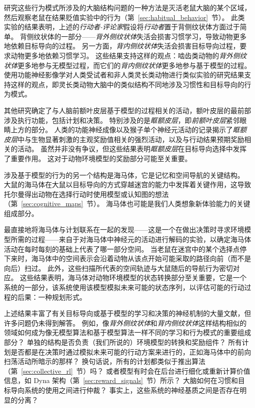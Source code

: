 研究这些行为模式所涉及的大脑结构问题的一种方法是灭活老鼠大脑的某个区域，然后观察老鼠在结果贬值实验中的行为（第~\ref{sec:habitual_behavior}~节）。
此类实验的结果表明，上述的\textit{行动者-评论家}假设将\textit{行动者}置于背侧纹状体方面过于简单。
背侧纹状体的一部分——\textit{背外侧纹状体}失活会损害习惯学习，导致动物更多地依赖目标导向的过程。
另一方面，\textit{背内侧纹状体}失活会损害目标导向过程，要求动物更多地依赖习惯学习。
这些结果支持这样的观点：啮齿类动物的\textit{背外侧纹状体}更多地参与无模型过程，而它们的\textit{背内侧纹状体}更多地参与基于模型的过程。
使用功能神经影像学对人类受试者和非人类灵长类动物进行类似实验的研究结果支持这样的观点，即灵长类动物大脑中的类似结构不同地涉及习惯性和目标导向的行为模式。


其他研究确定了与人脑前额叶皮层基于模型的过程相关的活动，额叶皮层的最前部涉及执行功能，包括计划和决策。
特别涉及的是\textit{眶额皮层}，即\textit{前额叶皮层}紧邻眼睛上方的部分。
人类的功能神经成像以及猴子单个神经元活动的记录揭示了\textit{眶额皮层}中与生物显著刺激的主观奖励值相关的强烈活动，以及与行动结果预期奖励相关的活动。
虽然并非没有争议，但这些结果表明\textit{眶额皮层}在目标导向选择中发挥了重要作用。
这对于动物环境模型的奖励部分可能至关重要。


涉及基于模型的行为的另一个结构是海马体，它是记忆和空间导航的关键结构。
大鼠的海马体在大鼠以目标导向的方式穿越迷宫的能力中发挥着关键作用，这导致托尔曼得出动物在选择行动时使用模型或认知图的想法（第~\ref{sec:cognitive_maps}~节）。
海马体也可能是我们人类想象新体验能力的关键组成部分\cite{hassabis2007deconstructing,olafsdottir2015hippocampal}。


最直接地将海马体与计划联系在一起的发现——这是一个在做出决策时寻求环境模型所需的过程——来自于对海马体中神经元的活动进行解码的实验，以确定海马体活动在每时每刻的基础上代表了哪一部分空间。
当老鼠在迷宫中的某个选择点停下来时，海马体中的空间表示会沿着动物从该点开始可能采取的路径向前（而不是向后）扫过\cite{johnson2007neural}。
此外，这些扫描所代表的空间轨迹与大鼠随后的导航行为密切对应\cite{pfeiffer2013hippocampal}。
这些结果表明，海马体对动物环境模型的状态转换部分至关重要，它是一个系统的一部分，该系统使用该模型模拟未来可能的状态序列，以评估可能的行动过程的后果：一种规划形式。


上述结果丰富了有关目标导向或基于模型的学习和决策的神经机制的大量文献，但许多问题仍未得到解答。
例如，像\textit{背外侧纹状体}和\textit{背内侧纹状体}这样结构相似的领域如何成为像无模型算法和基于模型算法一样不同的学习和行为模式的重要组成部分？
单独的结构是否负责（我们所说的）环境模型的转换和奖励组件？
所有计划是否都是在决策时通过模拟未来可能的行动方案来进行的，正如海马体中的前向扫荡活动所暗示的那样？
换句话说，所有的计划都类似于推出算法（第~\ref{sec:collective_rl}~节）吗？
或者模型有时会在后台进行细化或重新计算价值信息，如 Dyna 架构（第~\ref{sec:reward_signals}~节）所示？
大脑如何在习惯和目标导向系统的使用之间进行仲裁？
事实上，这些系统的神经基质之间是否存在明显的分离？


